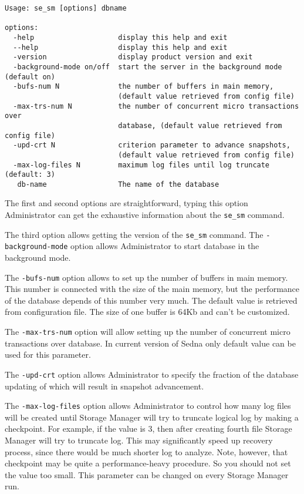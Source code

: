 \documentclass[a4paper,12pt]{article}
\begin{document}
\begin{verbatim}
Usage: se_sm [options] dbname

options:
  -help                    display this help and exit
  --help                   display this help and exit
  -version                 display product version and exit
  -background-mode on/off  start the server in the background mode (default on)
  -bufs-num N              the number of buffers in main memory,
                           (default value retrieved from config file)
  -max-trs-num N           the number of concurrent micro transactions over
                           database, (default value retrieved from config file)
  -upd-crt N               criterion parameter to advance snapshots,
                           (default value retrieved from config file)
  -max-log-files N         maximum log files until log truncate (default: 3)
   db-name                 The name of the database
\end{verbatim}

The first and second options are straightforward, typing this option Administrator can get the exhaustive information about the \verb!se_sm! command.

The third option allows getting the version of the \verb!se_sm! command.
The \verb!-background-mode! option allows Administrator to start database in the background mode.

The \verb!-bufs-num! option allows to set up the number of buffers in main memory. This number is connected with the size of the main memory, but the performance of the database depends of this number very much. The default value is retrieved from configuration file. The size of one buffer is 64Kb and can't be customized.

The \verb!-max-trs-num! option will allow setting up the number of concurrent micro transactions over database. In current version of Sedna only default value can be used for this parameter.

The \verb!-upd-crt! option allows Administrator to specify the fraction of the database updating of which will result in snapshot advancement.

The \verb!-max-log-files! option allows Administrator to control how many log files will be created until Storage Manager will try
to truncate logical log by making a checkpoint. For example, if the value is $3$, then after creating fourth file Storage Manager will try to truncate log. This may significantly speed up recovery process, since there would be much shorter log to analyze. Note, however, that checkpoint may be quite a performance-heavy procedure. So you should not set the value too small. This parameter can be changed on every Storage Manager run.
\end{document}
